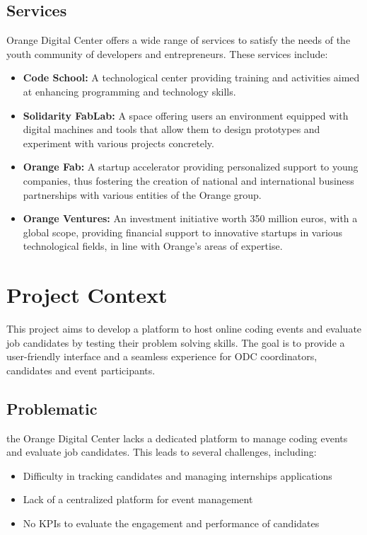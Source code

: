 \subsection{Services}
Orange Digital Center offers a wide range of services to satisfy the needs of
the youth community of developers and entrepreneurs. These services include:

\begin{itemize}
      \item \textbf{Code School:} A technological center providing training
            and activities aimed at enhancing programming and technology
            skills.
      \item \textbf{Solidarity FabLab:} A space offering users an environment
            equipped with digital machines and tools that allow them to
            design prototypes
            and experiment with various projects concretely.
      \item \textbf{Orange Fab:} A startup accelerator providing personalized
            support to young companies, thus fostering the creation of
            national and
            international business partnerships with various entities of the
            Orange group.
      \item \textbf{Orange Ventures:} An investment initiative worth 350
            million euros, with a global scope, providing financial support
            to innovative
            startups in various technological fields, in line with Orange's
            areas of
            expertise.
\end{itemize}

\section{Project Context}
This project aims to develop a platform to host online coding events and
evaluate job candidates by testing their problem solving skills. The goal
is to provide a user-friendly interface and a seamless experience for ODC
coordinators, candidates and event participants.

\subsection{Problematic}
the Orange Digital Center lacks a dedicated platform to
manage coding events and evaluate job candidates. This leads to several
challenges, including:
\begin{itemize}
      \item Difficulty in tracking candidates and managing internships
            applications
      \item Lack of a centralized platform for event management
      \item No KPIs to evaluate the engagement and performance of candidates
\end{itemize}

